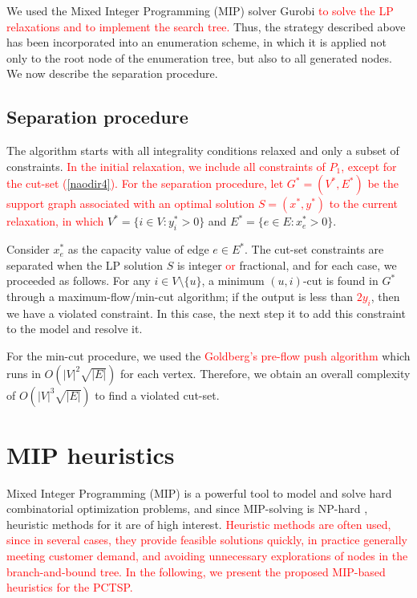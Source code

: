 \documentclass{ro}
\begin{document}
We used the Mixed Integer Programming (MIP) solver Gurobi \textcolor{red}{to solve the LP relaxations and to implement the search tree.} Thus, the strategy described above has been incorporated into an enumeration scheme, in which it is applied not only to the root node of the enumeration tree, but also to all generated nodes. We now describe the separation procedure.

\subsection{Separation procedure}

The algorithm starts with all integrality conditions relaxed and only a subset of constraints. \textcolor{red}{In the initial relaxation, we include all constraints of $P_1$, except for the cut-set (\ref{naodir4}). For the separation procedure, let $G^*=(V^*,E^*)$ be the support graph associated with an optimal solution $S=(x^*,y^*)$ to the current relaxation, in which} $V^* = \{i \in V : y_i^* > 0\}$ and $E^* = \{e \in E : x_e^* >0 \}$. 

Consider  $x_e^*$ as the capacity value of edge $e \in E^*$.
The cut-set constraints are separated when the LP solution $S$ is integer \textcolor{red}{or} fractional, and for each case, we proceeded as follows. For any $i \in V \setminus \{u\}$, a minimum $(u,i)$-cut is found in $G^*$ through a maximum-flow/min-cut algorithm; if the output is less than \textcolor{red}{$2y_i$}, then we have a violated constraint. In this case, the next step it to add this constraint to the model and resolve it.

For the min-cut procedure, we used the \textcolor{red}{Goldberg's pre-flow push algorithm} \cite{ciupala2008preflow} which runs in $O(|V|^2\sqrt{|E|})$ for each vertex. Therefore, we obtain an overall complexity of $O(|V|^3\sqrt{|E|})$   to find a violated cut-set.


\section{MIP heuristics}
\label{sec:mip}
Mixed Integer Programming (MIP) is a powerful tool to model and solve hard combinatorial optimization problems, and since MIP-solving is NP-hard \cite{wolsey2014integer}, heuristic methods for it are of high interest. \textcolor{red}{Heuristic methods are often used, since in several cases, they provide feasible solutions quickly, in practice generally meeting customer demand, and avoiding unnecessary explorations of nodes in the branch-and-bound tree. In the following, we present the proposed MIP-based heuristics for the PCTSP.}
\end{document}
